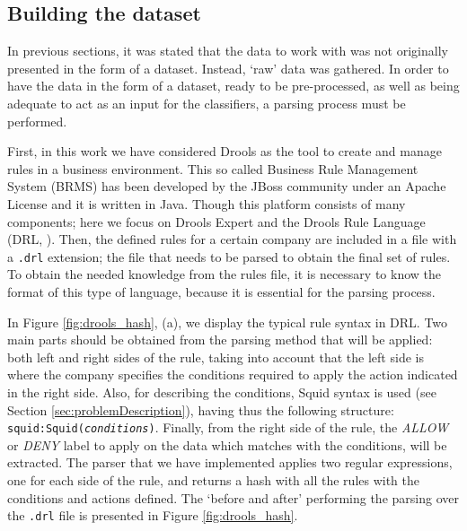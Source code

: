 \documentclass{llncs}
\begin{document}
%
\subsection{Building the dataset}
\label{sec:buldingdataset}

In previous sections, it was stated that the data to work with was not originally presented in the form of a dataset. Instead, `raw' data was gathered. In order to have the data in the form of a dataset, ready to be pre-processed, as well as being adequate to act as an input for the classifiers, a parsing process must be performed.

First, in this work we have considered Drools \cite{drools:site} as the tool to create and  manage rules in a business environment. This so called Business Rule Management System (BRMS) has been developed by the JBoss community under an Apache License and it is written in Java. Though this platform consists of many components; here we focus on Drools Expert and the Drools Rule Language (DRL, \cite{drools:doc}). Then, the defined rules for a certain company are included in a file with a \texttt{.drl} extension; the file that needs to be parsed to obtain the final set of rules. To obtain the needed knowledge from the rules file, it is necessary to know the format of this type of language, because it is essential for the parsing process.

In Figure \ref{fig:drools_hash}, (a), we display the typical rule syntax in DRL. Two main parts should be obtained from the parsing method that will be applied: both left and right sides of the rule, taking into account that the left side is where the company specifies the conditions required to apply the action indicated in the right side. Also, for describing the conditions, Squid syntax is used (see Section \ref{sec:problemDescription}), having thus the following structure: \texttt{squid:Squid(\textit{conditions})}. Finally, from the right side of the rule, the \textit{ALLOW} or \textit{DENY} label to apply on the data which matches with the conditions, will be extracted.
The parser that we have implemented applies two regular
expressions, one for each side of the rule, and returns a hash with
all the rules with the conditions and actions defined. The `before and
after' performing the parsing over the \texttt{.drl} file is presented
in Figure \ref{fig:drools_hash}.
\end{document}
